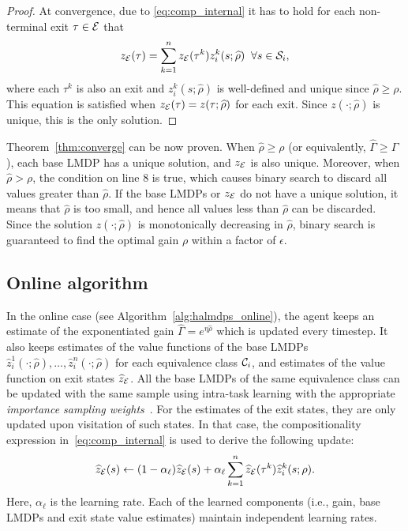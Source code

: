 \begin{proof}
At convergence, due to \eqref{eq:comp_internal} it has to hold for each non-terminal exit $\tau\in\mathcal{E}$ that
\[
  z_{\mathcal{E}}(\tau) = \sum_{k=1}^n z_{\mathcal{E}}(\tau^k) z_i^k(s;\widehat\rho)\;\;\forall s\in\mathcal{S}_i,
\]
where each $\tau^k$ is also an exit and $z_i^k(s;\widehat\rho)$ is well-defined and unique since $\widehat\rho\geq\rho$. This equation is satisfied when $z_{\mathcal{E}}(\tau)=z(\tau;\widehat\rho)$ for each exit. Since $z(\cdot;\widehat\rho)$ is unique, this is the only solution.
\end{proof}

Theorem~\ref{thm:converge} can be now proven. When $\widehat\rho\geq\rho$ (or equivalently, $\widehat\Gamma\geq\Gamma$), each base LMDP has a unique solution, and $z_{\mathcal{E}}$ is also unique. Moreover, when $\widehat\rho>\rho$, the condition on line 8 is true, which causes binary search to discard all values greater than $\widehat\rho$. If the base LMDPs or $z_{\mathcal{E}}$ do not have a unique solution, it means that $\widehat\rho$ is too small, and hence all values less than $\widehat\rho$ can be discarded. Since the solution $z(\cdot;\widehat\rho)$ is monotonically decreasing in $\widehat\rho$, binary search is guaranteed to find the optimal gain $\rho$ within a factor of $\epsilon$.

\subsection{Online algorithm}
 In the online case (see Algorithm~\ref{alg:halmdps_online}), the agent keeps an estimate of the exponentiated gain $\widehat\Gamma=e^{\eta\widehat\rho}$ which is updated every timestep. It also keeps estimates of the value functions of the base LMDPs $\widehat z_i^1(\cdot;\widehat\rho),\ldots,\widehat z_i^n(\cdot;\widehat\rho)$ for each equivalence class $\mathcal{C}_i$, and estimates of the value function on exit states $\widehat z_{\mathcal{E}}$.  All the base LMDPs of the same equivalence class can be updated with the same sample using intra-task learning with the appropriate {\it importance sampling weights\/}~\citep{Jonsson2016}. For the estimates of the exit states, they are only updated upon visitation of such states. In that case, the compositionality expression in~\eqref{eq:comp_internal} is used to derive the following update:
\begin{equation}
  \widehat z_{\mathcal{E}}(s)\gets (1-\alpha_\ell) \widehat z_{\mathcal{E}}(s) + \alpha_\ell \sum_{k=1}^n \widehat z_{\mathcal{E}}(\tau^k) \widehat z_i^k(s;\rho).
  \label{eq:halmdps_update_exit}
\end{equation}
Here, $\alpha_\ell$ is the learning rate. Each of the learned components (i.e., gain, base LMDPs and exit state value estimates) maintain independent learning rates.

